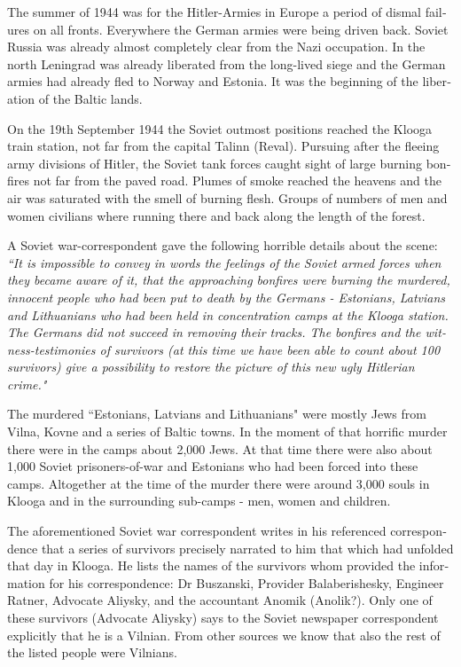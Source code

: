 \documentclass{article}
\begin{document}
\begin{pairs}
\begin{Leftside}
\begin{english}
The summer of 1944 was for the Hitler-Armies in Europe a period
of dismal failures on all fronts. Everywhere the German armies 
were being driven back. Soviet Russia was already almost completely
clear from the Nazi occupation. In the north Leningrad was already
liberated from the long-lived siege and the German armies had already
fled to Norway and Estonia. It was the beginning of the liberation of the Baltic
lands.

On the 19th September 1944 the Soviet outmost positions reached the Klooga train station,
not far from the capital Talinn (Reval). Pursuing after the fleeing army divisions of Hitler, the
Soviet tank forces caught sight of large burning bonfires not far from the paved road.  Plumes
of smoke reached the heavens and the air was saturated with the smell of burning flesh. Groups of numbers of
men and women civilians where running there and back along the length of the forest.

A Soviet war-correspondent gave the following horrible details about the scene:
\emph{``It is impossible to convey in words the feelings of the Soviet armed forces when they
became aware of it, that the approaching bonfires were burning the murdered, innocent people who
had been put to death by the Germans - Estonians, Latvians and Lithuanians who had been held in
concentration camps at the Klooga station. The Germans did not succeed in removing their tracks.
The bonfires and the witness-testimonies of survivors 
(at this time we have been able to count about 100 survivors) give a possibility to restore the picture
of this new ugly Hitlerian crime."}

The murdered ``Estonians, Latvians and Lithuanians" were mostly Jews from Vilna, Kovne and a series
of Baltic towns. In the moment of that horrific murder there were in the camps about 2,000 Jews.
At that time there were also about 1,000 Soviet prisoners-of-war and Estonians who had been forced
into these camps. Altogether at the time of the murder there were around 3,000 souls in Klooga and in the 
surrounding sub-camps - men, women and children.

The aforementioned Soviet war correspondent writes in his referenced correspondence that a 
series of survivors precisely narrated to him that which had unfolded that day in Klooga. He lists the names
of the survivors whom provided the information for his correspondence: Dr Buszanski, Provider Balaberishesky,
Engineer Ratner, Advocate Aliysky, and the accountant Anomik (Anolik?). Only one of these survivors (Advocate
Aliysky) says to the Soviet newspaper correspondent explicitly that he is a Vilnian. From other sources we know
that also the rest of the listed people were Vilnians.


\end{english}
\end{Leftside}
\end{pairs}
\end{document}

